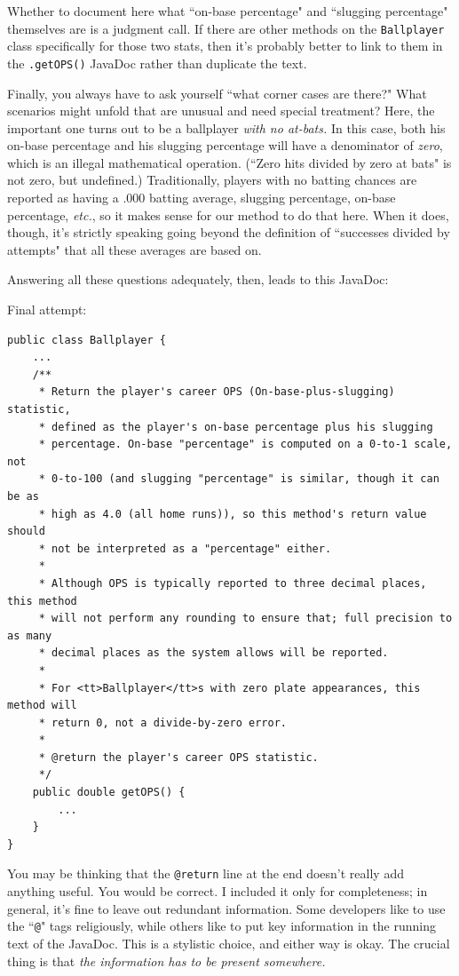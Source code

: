Whether to document here what ``on-base percentage" and ``slugging percentage"
themselves are is a judgment call. If there are other methods on the
\texttt{Ballplayer} class specifically for those two stats, then it's probably
better to link to them in the \texttt{.getOPS()} JavaDoc rather than duplicate
the text.

Finally, you always have to ask yourself ``what corner cases are there?" What
scenarios might unfold that are unusual and need special treatment? Here, the
important one turns out to be a ballplayer \textit{with no at-bats.} In this
case, both his on-base percentage and his slugging percentage will have a
denominator of \textit{zero}, which is an illegal mathematical operation.
(``Zero hits divided by zero at bats" is not zero, but undefined.)
Traditionally, players with no batting chances are reported as having a .000
batting average, slugging percentage, on-base percentage, \textit{etc.}, so it
makes sense for our method to do that here. When it does, though, it's
strictly speaking going beyond the definition of ``successes divided by
attempts" that all these averages are based on.

Answering all these questions adequately, then, leads to this JavaDoc:

\pagebreak
Final attempt:
\vspace{-.15in}
\begin{Verbatim}[fontsize=\footnotesize,samepage=true,frame=single]
public class Ballplayer {
    ...
    /**
     * Return the player's career OPS (On-base-plus-slugging) statistic,
     * defined as the player's on-base percentage plus his slugging 
     * percentage. On-base "percentage" is computed on a 0-to-1 scale, not
     * 0-to-100 (and slugging "percentage" is similar, though it can be as
     * high as 4.0 (all home runs)), so this method's return value should
     * not be interpreted as a "percentage" either.
     * 
     * Although OPS is typically reported to three decimal places, this method
     * will not perform any rounding to ensure that; full precision to as many
     * decimal places as the system allows will be reported.
     *
     * For <tt>Ballplayer</tt>s with zero plate appearances, this method will
     * return 0, not a divide-by-zero error.
     *
     * @return the player's career OPS statistic.
     */
    public double getOPS() {
        ...
    }
}
\end{Verbatim}

You may be thinking that the \texttt{@return} line at the end doesn't really
add anything useful. You would be correct. I included it only for
completeness; in general, it's fine to leave out redundant information. Some
developers like to use the ``\texttt{@}" tags religiously, while others like
to put key information in the running text of the JavaDoc. This is a stylistic
choice, and either way is okay. The crucial thing is that \textit{the
information has to be present somewhere.}

